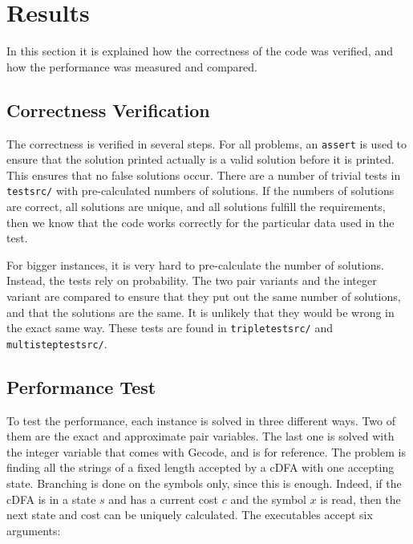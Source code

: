 \documentclass[a4paper,11pt]{article}
\begin{document}
\section{Results}
In this section it is explained how the correctness of the code was verified, and how the performance was measured and compared.

\subsection{Correctness Verification}
The correctness is verified in several steps. For all problems, an \texttt{assert} is used to ensure that the solution printed actually is a valid solution before it is printed. This ensures that no false solutions occur. There are a number of trivial tests in \texttt{testsrc/} with pre-calculated numbers of solutions. If the numbers of solutions are correct, all solutions are unique, and all solutions fulfill the requirements, then we know that the code works correctly for the particular data used in the test.

For bigger instances, it is very hard to pre-calculate the number of solutions. Instead, the tests rely on probability. The two pair variants and the integer variant are compared to ensure that they put out the same number of solutions, and that the solutions are the same. It is unlikely that they would be wrong in the exact same way. These tests are found in \texttt{tripletestsrc/} and \texttt{multisteptestsrc/}.

\subsection{Performance Test}
\label{sec:performancetest}
To test the performance, each instance is solved in three different ways. Two of them are the exact and approximate pair variables. The last one is solved with the integer variable that comes with Gecode, and is for reference. The problem is finding all the strings of a fixed length accepted by a cDFA with one accepting state. Branching is done on the symbols only, since this is enough. Indeed, if the cDFA is in a state $s$ and has a current cost $c$ and the symbol $x$ is read, then the next state and cost can be uniquely calculated. The executables accept six arguments: 
\end{document}
